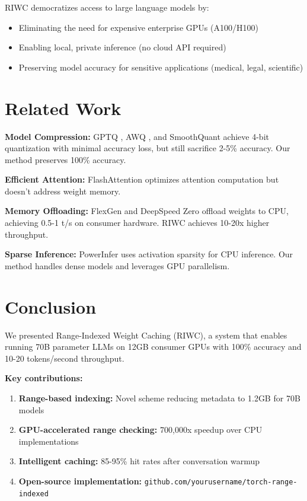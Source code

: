 \documentclass[twocolumn,10pt]{article}
\begin{document}
RIWC democratizes access to large language models by:

\begin{itemize}
    \item Eliminating the need for expensive enterprise GPUs (A100/H100)
    \item Enabling local, private inference (no cloud API required)
    \item Preserving model accuracy for sensitive applications (medical, legal, scientific)
\end{itemize}

\section{Related Work}

\textbf{Model Compression:} GPTQ \cite{frantar2022gptq}, AWQ \cite{lin2023awq}, and SmoothQuant \cite{xiao2023smoothquant} achieve 4-bit quantization with minimal accuracy loss, but still sacrifice 2-5\% accuracy. Our method preserves 100\% accuracy.

\textbf{Efficient Attention:} FlashAttention \cite{dao2022flashattention} optimizes attention computation but doesn't address weight memory.

\textbf{Memory Offloading:} FlexGen \cite{sheng2023flexgen} and DeepSpeed Zero \cite{rajbhandari2020deepspeed} offload weights to CPU, achieving 0.5-1 t/s on consumer hardware. RIWC achieves 10-20x higher throughput.

\textbf{Sparse Inference:} PowerInfer \cite{xue2023powerinfer} uses activation sparsity for CPU inference. Our method handles dense models and leverages GPU parallelism.

\section{Conclusion}

We presented Range-Indexed Weight Caching (RIWC), a system that enables running 70B parameter LLMs on 12GB consumer GPUs with 100\% accuracy and 10-20 tokens/second throughput.

\textbf{Key contributions:}
\begin{enumerate}
    \item \textbf{Range-based indexing:} Novel scheme reducing metadata to 1.2GB for 70B models
    \item \textbf{GPU-accelerated range checking:} 700,000x speedup over CPU implementations
    \item \textbf{Intelligent caching:} 85-95\% hit rates after conversation warmup
    \item \textbf{Open-source implementation:} \texttt{github.com/yourusername/torch-range-indexed}
\end{enumerate}
\end{document}
